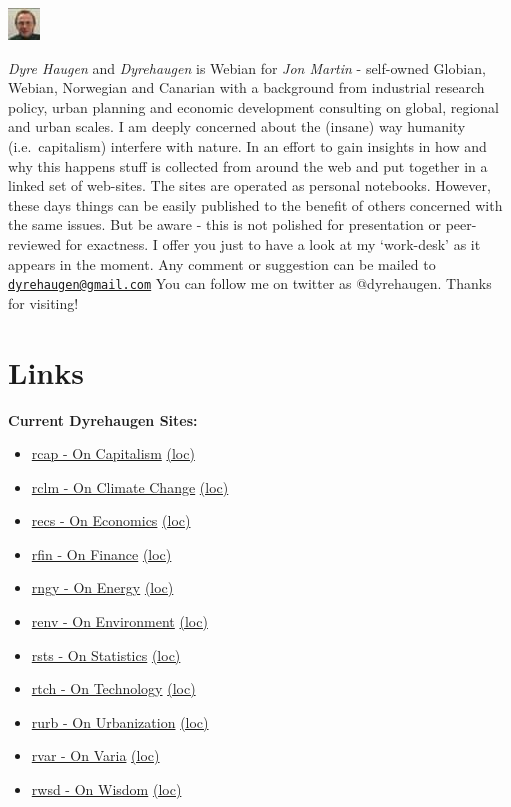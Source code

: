 \documentclass[
]{book}
\providecommand{\tightlist}{%
  \setlength{\itemsep}{0pt}\setlength{\parskip}{0pt}}
\begin{document}
\includegraphics{fig/me.jpg}

\emph{Dyre Haugen} and \emph{Dyrehaugen} is Webian for \emph{Jon Martin} -
self-owned Globian, Webian, Norwegian and Canarian with
a background from industrial research policy, urban planning and
economic development consulting on global, regional and urban scales.
I am deeply concerned about the (insane) way
humanity (i.e.~capitalism) interfere with nature.
In an effort to gain insights in how and why this happens
stuff is collected from around the web and put together
in a linked set of web-sites.
The sites are operated as personal notebooks.
However, these days things can be easily published to the
benefit of others concerned with the same issues.
But be aware - this is not polished for presentation or
peer-reviewed for exactness.
I offer you just to have a look at my `work-desk' as it appears in the moment.
Any comment or suggestion can be mailed to \href{mailto:dyrehaugen@gmail.com}{\nolinkurl{dyrehaugen@gmail.com}}
You can follow me on twitter as @dyrehaugen.
Thanks for visiting!

\hypertarget{links}{%
\chapter{Links}\label{links}}

\textbf{Current Dyrehaugen Sites:}

\begin{itemize}
\tightlist
\item
  \href{https://dyrehaugen.github.io/rcap}{rcap - On Capitalism} \href{http://localhost/rcap}{(loc)}
\item
  \href{https://dyrehaugen.github.io/rclm}{rclm - On Climate Change} \href{http://localhost/rclm}{(loc)}
\item
  \href{https://dyrehaugen.github.io/recs}{recs - On Economics} \href{http://localhost/recs}{(loc)}
\item
  \href{https://dyrehaugen.github.io/rngy}{rfin - On Finance} \href{http://localhost/rfin}{(loc)}
\item
  \href{https://dyrehaugen.github.io/rngy}{rngy - On Energy} \href{http://localhost/rngy}{(loc)}
\item
  \href{https://dyrehaugen.github.io/renv}{renv - On Environment} \href{http://localhost/renv}{(loc)}
\item
  \href{https://dyrehaugen.github.io/rsts}{rsts - On Statistics} \href{http://localhost/rsts}{(loc)}
\item
  \href{https://dyrehaugen.github.io/rtch}{rtch - On Technology} \href{http://localhost/rtch}{(loc)}
\item
  \href{https://dyrehaugen.github.io/rurb}{rurb - On Urbanization} \href{http://localhost/rurb}{(loc)}
\item
  \href{https://dyrehaugen.github.io/rvar}{rvar - On Varia} \href{http://localhost/rvar}{(loc)}
\item
  \href{https://dyrehaugen.github.io/rwsd}{rwsd - On Wisdom} \href{http://localhost/rwsd}{(loc)}
\end{itemize}
\end{document}
